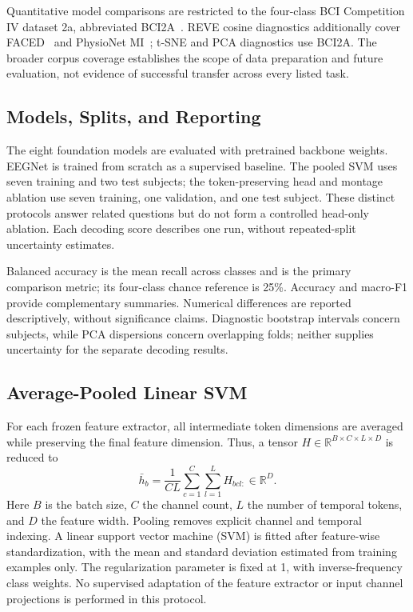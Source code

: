 \documentclass{article}
\begin{document}
Quantitative model comparisons are restricted to the four-class BCI
Competition IV dataset 2a, abbreviated BCI2A~\cite{brunner2008bci2a}.
REVE cosine diagnostics additionally cover FACED~\cite{chen2023faced}
and PhysioNet MI~\cite{schalk2009physionet};
t-SNE and PCA diagnostics use BCI2A. The broader corpus coverage establishes
the scope of data preparation and future evaluation, not evidence of
successful transfer across every listed task.

\subsection{Models, Splits, and Reporting}

The eight foundation models are evaluated with pretrained backbone weights.
EEGNet is trained from scratch as a supervised baseline. The pooled SVM
uses seven training and two test subjects; the token-preserving head and
montage ablation use seven training, one validation, and one test subject.
These distinct protocols answer related questions but do not form a
controlled head-only ablation. Each decoding score describes one run,
without repeated-split uncertainty estimates.

Balanced accuracy is the mean recall across classes and is the primary
comparison metric; its four-class chance reference is 25\%. Accuracy and
macro-F1 provide complementary summaries. Numerical differences are
reported descriptively, without significance claims. Diagnostic bootstrap
intervals concern subjects, while PCA dispersions concern overlapping
folds; neither supplies uncertainty for the separate decoding results.

\subsection{Average-Pooled Linear SVM}
\label{sec:svm-method}

For each frozen feature extractor, all intermediate token dimensions are
averaged while preserving the final feature dimension. Thus, a tensor
$H\in\mathbb{R}^{B\times C\times L\times D}$ is reduced to
\begin{equation}
    \bar h_b=\frac{1}{CL}\sum_{c=1}^{C}\sum_{l=1}^{L}H_{bcl:}
    \in\mathbb{R}^{D}.
\end{equation}
Here $B$ is the batch size, $C$ the channel count, $L$ the number of
temporal tokens, and $D$ the feature width. Pooling removes explicit
channel and temporal indexing. A linear support
vector machine (SVM) is fitted after feature-wise standardization, with
the mean and standard deviation estimated from training examples only.
The regularization parameter is fixed at 1, with inverse-frequency class
weights. No supervised adaptation of the feature extractor or input
channel projections is performed in this protocol.
\end{document}
